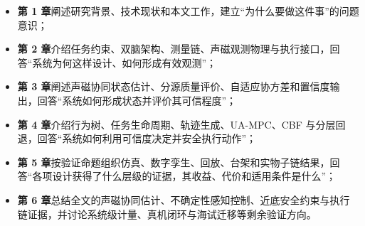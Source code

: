 \begin{itemize}
\tightlist
\item
  \textbf{第 1 章}阐述研究背景、技术现状和本文工作，建立``为什么要做这件事''的问题意识；
\item
  \textbf{第 2 章}介绍任务约束、双脑架构、测量链、声磁观测物理与执行接口，回答``系统为何这样设计、如何形成有效观测''；
\item
  \textbf{第 3 章}阐述声磁协同状态估计、分源质量评价、自适应协方差和置信度输出，回答``系统如何形成状态并评价其可信程度''；
\item
  \textbf{第 4 章}介绍行为树、任务生命周期、轨迹生成、UA-MPC、CBF 与分层回退，回答``系统如何利用可信度决定并安全执行动作''；
\item
  \textbf{第 5 章}按验证命题组织仿真、数字孪生、回放、台架和实物子链结果，回答``各项设计获得了什么层级的证据，其收益、代价和适用条件是什么''；
\item
  \textbf{第 6 章}总结全文的声磁协同估计、不确定性感知控制、近底安全约束与执行链证据，并讨论系统级计量、真机闭环与海试迁移等剩余验证方向。
\end{itemize}
